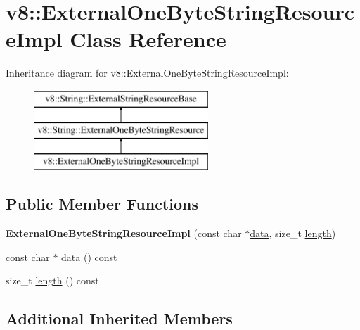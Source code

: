 \hypertarget{classv8_1_1_external_one_byte_string_resource_impl}{}\section{v8\+:\+:External\+One\+Byte\+String\+Resource\+Impl Class Reference}
\label{classv8_1_1_external_one_byte_string_resource_impl}
Inheritance diagram for v8\+:\+:External\+One\+Byte\+String\+Resource\+Impl\+:\begin{figure}[H]
\begin{center}
\leavevmode
\includegraphics[height=3.000000cm]{classv8_1_1_external_one_byte_string_resource_impl}
\end{center}
\end{figure}
\subsection*{Public Member Functions}
\begin{DoxyCompactItemize}
\item 
\hypertarget{classv8_1_1_external_one_byte_string_resource_impl_a46178fb208419f5ea99552871b3a373e}{}{\bfseries External\+One\+Byte\+String\+Resource\+Impl} (const char $\ast$\hyperlink{classv8_1_1_external_one_byte_string_resource_impl_a37ada5dc21ecb982c50482c90fffe529}{data}, size\+\_\+t \hyperlink{classv8_1_1_external_one_byte_string_resource_impl_aedcf350d46f64cf1e3045658920d1dc8}{length})\label{classv8_1_1_external_one_byte_string_resource_impl_a46178fb208419f5ea99552871b3a373e}

\item 
const char $\ast$ \hyperlink{classv8_1_1_external_one_byte_string_resource_impl_a37ada5dc21ecb982c50482c90fffe529}{data} () const 
\item 
size\+\_\+t \hyperlink{classv8_1_1_external_one_byte_string_resource_impl_aedcf350d46f64cf1e3045658920d1dc8}{length} () const 
\end{DoxyCompactItemize}
\subsection*{Additional Inherited Members}


